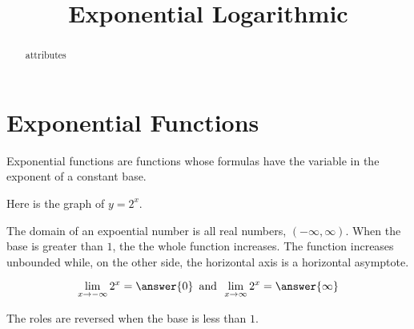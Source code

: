 \documentclass{ximera}
\title{Exponential Logarithmic}
\begin{document}
\begin{abstract}
attributes
\end{abstract}
\maketitle


\section{Exponential Functions}

Exponential functions are functions whose formulas have the variable in the exponent of a constant base.






Here is the graph of $y = 2^x$.

\begin{image}
\end{image}


The domain of an expoential number is all real numbers, $(-\infty, \infty)$.  When the base is greater than $1$, the the whole function increases.  The function increases unbounded while, on the other side, the horizontal axis is a horizontal asymptote.

\[  \lim_{x \to -\infty} 2^x = \answer{0}     \, \text{ and } \,  \lim_{x \to \infty} 2^x = \answer{\infty}   \]



The roles are reversed when the base is less than $1$.
\end{document}
